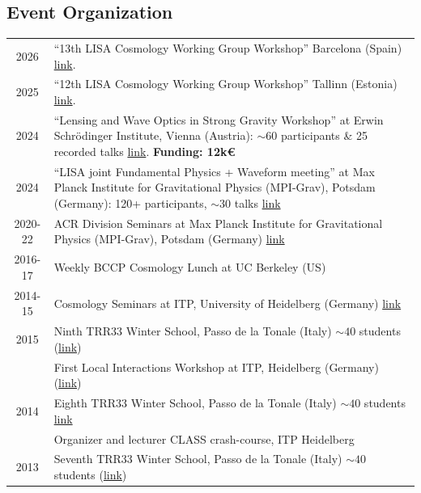 \documentclass[11pt,a4paper]{article}
\begin{document}
\subsection*{Event Organization}
\vspace{-.3cm}
\begin{longtable}{c p{14.5cm}}
2026
 & {``13th LISA Cosmology Working Group Workshop''} %
 Barcelona (Spain)  \href{https://indico.icc.ub.edu/event/677/}{link}. \\[3pt]
2025
 & {``12th LISA Cosmology Working Group Workshop''} %
 Tallinn (Estonia)
 \href{https://indico.cern.ch/event/1488828/}{link}. %
\\[3pt]
2024
 &  {``Lensing and Wave Optics in Strong Gravity Workshop''} at Erwin Schr\"odinger Institute, Vienna (Austria): $\sim 60$  participants \& 25 recorded talks \href{https://www.esi.ac.at/events/e546/}{link}. \textbf{Funding: 12k\euro}
\\[3pt]
2024 & {``LISA joint Fundamental Physics + Waveform meeting''} at Max Planck Institute for Gravitational Physics (MPI-Grav), Potsdam (Germany): 120+ participants, $\sim30$ talks \href{https://workshops.aei.mpg.de/fpmeetswavelisa/}{link} 
\\[2pt]
2020-22 &  {ACR Division Seminars} at Max Planck Institute for Gravitational Physics (MPI-Grav), Potsdam (Germany)  \href{https://www.aei.mpg.de/139117/seminars}{link} \\[2pt]
2016-17 & Weekly {BCCP Cosmology Lunch} at UC Berkeley (US) \\
2014-15 &  {Cosmology Seminars} at ITP, University of Heidelberg (Germany)  \href{http://www.thphys.uni-heidelberg.de/~cosmo/dokuwiki/doku.php/seminar}{link} \\[2pt]
2015  &  {Ninth TRR33 Winter School}, Passo de la Tonale (Italy) $\sim 40$ students (\href{http://darkuniverse.uni-hd.de/view/Main/WinterSchool15}{link}) \\[2pt]
&  {First Local Interactions Workshop} at ITP, Heidelberg (Germany) (\href{http://www.thphys.uni-heidelberg.de/~cosmo/inter15/}{link}) \\[2pt]
2014 &  {Eighth TRR33 Winter School}, Passo de la Tonale (Italy) $\sim 40$ students \href{http://darkuniverse.uni-hd.de/view/Main/WinterSchool14}{link} \\[2pt]
 & Organizer and lecturer {CLASS crash-course}, ITP Heidelberg \\[2pt]
2013 & {Seventh TRR33 Winter School}, Passo de la Tonale (Italy) $\sim 40$ students (\href{http://darkuniverse.uni-hd.de/view/Main/WinterSchool13}{link})
\end{longtable}
\end{document}
